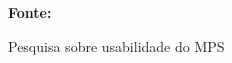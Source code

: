 \begin{figure}[h!]
\centering

\caption{\textmd{Pesquisa sobre usabilidade do MPS}}
\label{fig:usuariosMPS}

\par\medskip\textbf{Fonte:} \cite{voelter2014generic} \par\medskip
\end{figure}

